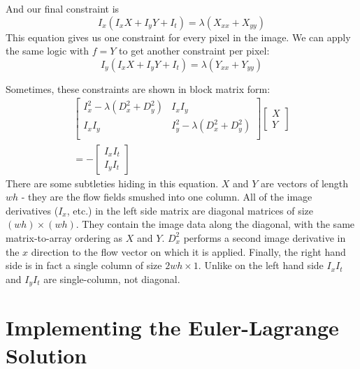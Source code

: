 \documentclass[10pt,twocolumn,letterpaper]{article}
\begin{document}
And our final constraint is
\begin{equation} \label{eq:eulerPlug6}
I_x (I_x X + I_y Y + I_t) = \lambda (X_{xx} + X_{yy})
\end{equation}
This equation gives us one constraint for every pixel in the image.  We can apply the same logic with $f=Y$ to get another constraint per pixel:
\begin{equation} \label{eq:eulerPlug7}
I_y (I_x X + I_y Y + I_t) = \lambda (Y_{xx} + Y_{yy})
\end{equation}

Sometimes, these constraints are shown in block matrix form:
\begin{multline} \label{eq:eulerBlock}
\left[ \begin{array}{cc}
I_x^2 - \lambda (D_x^2 + D_y^2) & I_x I_y\\
I_x I_y & I_y^2 - \lambda (D_x^2 + D_y^2) \\
\end{array} \right]
\left[\begin{array}{c}
X \\
Y
\end{array} \right] \\
=-\left[ \begin{array}{c}
I_x I_t \\
I_y I_t
\end{array} \right]
\end{multline}
There are some subtleties hiding in this equation.  $X$ and $Y$ are vectors of length $wh$ - they are the flow fields smushed into one column.  All of the image derivatives ($I_x$, etc.) in the left side matrix are diagonal matrices of size $(wh) \times (wh)$.  They contain the image data along the diagonal, with the same matrix-to-array ordering as $X$ and $Y$.  $D_x^2$ performs a second image derivative in the $x$ direction to the flow vector on which it is applied.  Finally, the right hand side is in fact a single column of size $2wh \times 1$.  Unlike on the left hand side $I_x I_t$ and $I_y I_t$ are single-column, not diagonal.

\section{Implementing the Euler-Lagrange Solution}
\end{document}
